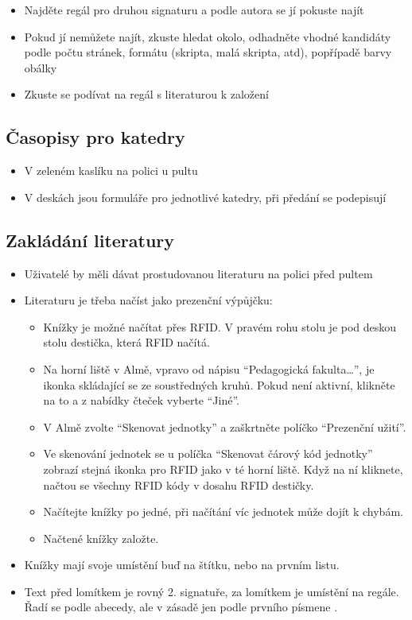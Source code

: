 \documentclass{article}
\begin{document}
\begin{itemize}
  \item Najděte regál pro druhou signaturu a podle autora se jí pokuste najít
  \item Pokud jí nemůžete najít, zkuste hledat okolo, odhadněte vhodné kandidáty podle počtu
    stránek, formátu (skripta, malá skripta, atd), popřípadě barvy obálky
  \item Zkuste se podívat na regál s literaturou k založení
\end{itemize}

\subsection{Časopisy pro katedry}
\begin{itemize}
  \item V zeleném kaslíku na polici u pultu
  \item  V deskách jsou formuláře pro jednotlivé katedry, při předání se podepisují
\end{itemize}

\subsection{Zakládání literatury}

\begin{itemize}
\item  Uživatelé by měli dávat prostudovanou literaturu na polici před pultem
\item  Literaturu je třeba načíst jako prezenční výpůjčku:
  \begin{itemize}
    \item  Knížky je možné načítat přes RFID. V pravém rohu stolu je pod deskou stolu destička, která RFID načítá.
    \item Na horní liště v Almě, vpravo od nápisu \enquote{Pedagogická fakulta\ldots}, je ikonka skládající se ze soustředných kruhů. Pokud není aktivní, klikněte na to a z nabídky čteček vyberte \enquote{Jiné}.
    \item  V Almě zvolte \enquote{Skenovat jednotky} a zaškrtněte políčko \enquote{Prezenční užití}.
    \item Ve skenování jednotek se u políčka \enquote{Skenovat čárový kód jednotky} zobrazí stejná ikonka pro RFID jako v té horní liště. Když na ní kliknete, načtou se všechny RFID kódy v dosahu RFID destičky.
    \item Načítejte knížky po jedné, při načítání víc jednotek může dojít k chybám.
    \item Načtené knížky založte.
  \end{itemize}
\item Knížky mají svoje umístění buď na štítku, nebo na prvním listu.
\item Text před lomítkem je rovný 2. signatuře, za lomítkem je umístění na regále. Řadí se podle abecedy, ale v zásadě jen podle prvního písmene .
\end{itemize}
\end{document}
